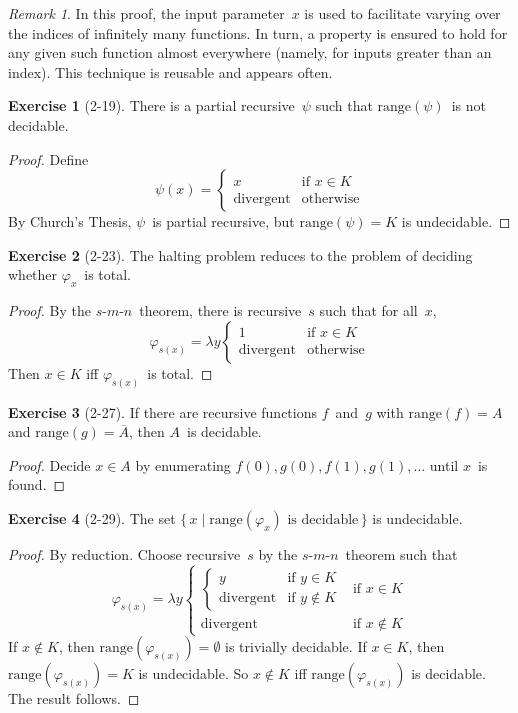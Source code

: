 \documentclass[letterpaper]{article}
\newcommand{\ran}{\mathrm{range}}
\newcommand{\comp}[1]{\overline{#1}}
\newcommand{\smn}{$s$-$m$-$n$}
\theoremstyle{definition}
\newtheorem*{exer}{Exercise}
\theoremstyle{remark}
\newtheorem*{rmk}{Remark}
\theoremstyle{direction}
\begin{document}
\begin{rmk}
In this proof, the input parameter~$x$ is used to facilitate varying over the indices of infinitely many functions. In turn, a property is ensured to hold for any given such function almost everywhere (namely, for inputs greater than an index). This technique is reusable and appears often.
\end{rmk}

\begin{exer}[2-19]
There is a partial recursive~$\psi$ such that $\ran(\psi)$~is not decidable.
\end{exer}
\begin{proof}
Define
$$\psi(x)=\begin{cases}
x&\text{if }x\in K\\
\text{divergent}&\text{otherwise}
\end{cases}$$
By Church's Thesis, $\psi$~is partial recursive, but $\ran(\psi)=K$ is undecidable.
\end{proof}

\begin{exer}[2-23]
The halting problem reduces to the problem of deciding whether $\varphi_x$~is total.
\end{exer}
\begin{proof}
By the \smn\ theorem, there is recursive~$s$ such that for all~$x$,
$$\varphi_{s(x)}=\lambda y\begin{cases}
1&\text{if }x\in K\\
\text{divergent}&\text{otherwise}
\end{cases}$$
Then $x\in K$ iff $\varphi_{s(x)}$~is total.
\end{proof}

\begin{exer}[2-27]
If there are recursive functions $f$~and~$g$ with $\ran(f)=A$ and $\ran(g)=\comp{A}$, then $A$~is decidable.
\end{exer}
\begin{proof}
Decide $x\in A$ by enumerating $f(0),g(0),f(1),g(1),\ldots$ until $x$~is found.
\end{proof}

\begin{exer}[2-29]
The set $\{\,x\mid\ran(\varphi_x)\text{ is decidable}\,\}$ is undecidable.
\end{exer}
\begin{proof}
By reduction. Choose recursive~$s$ by the \smn\ theorem such that
$$\varphi_{s(x)}=\lambda y\begin{cases}
\begin{cases}
y&\text{if }y\in K\\
\text{divergent}&\text{if }y\not\in K
\end{cases}&\text{if }x\in K\\
\text{divergent}&\text{if }x\not\in K
\end{cases}$$
If $x\not\in K$, then $\ran(\varphi_{s(x)})=\emptyset$ is trivially decidable. If $x\in K$, then $\ran(\varphi_{s(x)})=K$ is undecidable. So $x\not\in K$ iff $\ran(\varphi_{s(x)})$ is decidable. The result follows.
\end{proof}
\end{document}

